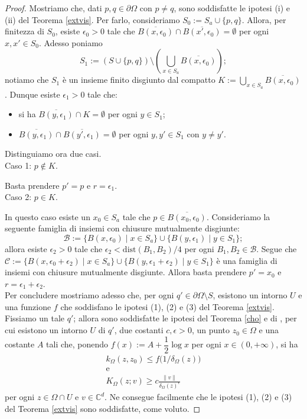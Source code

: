 \begin{proof}
    Mostriamo che, dati $p,q\in\partial\Omega$ con $p\not=q$, sono soddisfatte le ipotesi (i) e (ii) del Teorema \ref{extvis}. Per farlo, consideriamo $S_0:=S_a\cup\{p,q\}$. Allora, per finitezza di $S_0$, esiste $\epsilon_0>0$ tale che $\overline{B(x,\epsilon_0)}\cap\overline{B(x',\epsilon_0)}=\emptyset$ per ogni $x,x'\in S_0$. Adesso poniamo
    $$S_1:=(S\cup\{p,q\})\setminus\left(\bigcup_{x\in S_a}\overline{B(x,\epsilon_0)}\right);$$
    notiamo che $S_1$ è un insieme finito disgiunto dal compatto $K:=\displaystyle\bigcup_{x\in S_a}\overline{B(x,\epsilon_0)}$. Dunque esiste $\epsilon_1>0$ tale che:
    \begin{itemize}
        \item si ha $\overline{B(y,\epsilon_1)}\cap K=\emptyset$ per ogni $y\in S_1$;
        \item $\overline{B(y,\epsilon_1)}\cap\overline{B(y',\epsilon_1)}=\emptyset$ per ogni $y,y'\in S_1$ con $y\not=y'$.
    \end{itemize}
    
    Distinguiamo ora due casi. \\

    Caso 1: $p\not\in K$.

    Basta prendere $p'=p$ e $r=\epsilon_1$. \\

    Caso 2: $p\in K$.

    In questo caso esiste un $x_0\in S_a$ tale che $p\in\overline{B(x_0,\epsilon_0)}$. Consideriamo la seguente famiglia di insiemi con chiusure mutualmente disgiunte:
    $$\mathcal{B}:=\{B(x,\epsilon_0)\mid x\in S_a\}\cup\{B(y,\epsilon_1)\mid y\in S_1\};$$
    allora esiste $\epsilon_2>0$ tale che $\epsilon_2<\text{dist}(B_1,B_2)/4$ per ogni $B_1,B_2\in\mathcal{B}$. Segue che $\mathcal{C}:=\{B(x,\epsilon_0+\epsilon_2)\mid x\in S_a\}\cup\{B(y,\epsilon_1+\epsilon_2)\mid y\in S_1\}$ è una famiglia di insiemi con chiusure mutualmente disgiunte. Allora basta prendere $p'=x_0$ e $r=\epsilon_1+\epsilon_2$. \\

    Per concludere mostriamo adesso che, per ogni $q'\in\partial\Omega\setminus S$, esistono un intorno $U$ e una funzione $f$ che soddisfano le ipotesi (1), (2) e (3) del Teorema \ref{extvis}. Fissiamo un tale $q'$; allora sono soddisfatte le ipotesi del Teorema \ref{cho} e di \cite[Proposition 2.5]{FR}, per cui esistono un intorno $U$ di $q'$, due costanti $c,\epsilon>0$, un punto $z_0\in\Omega$ e una costante $A$ tali che, ponendo $f(x):=A+\dfrac{1}{2}\log{x}$ per ogni $x\in(0,+\infty)$, si ha
    \begin{gather*}
        k_\Omega(z,z_0) \le f\big(1/\delta_\Omega(z)\big)\\
        \text{e}\\
        K_\Omega(z;v) \ge c\frac{\|v\|}{\delta_\Omega(z)^{\epsilon}}
    \end{gather*}
    per ogni $z\in\Omega\cap U$ e $v\in\mathbb{C}^d$. Ne consegue facilmente che le ipotesi (1), (2) e (3) del Teorema \ref{extvis} sono soddisfatte, come voluto.
\end{proof}

